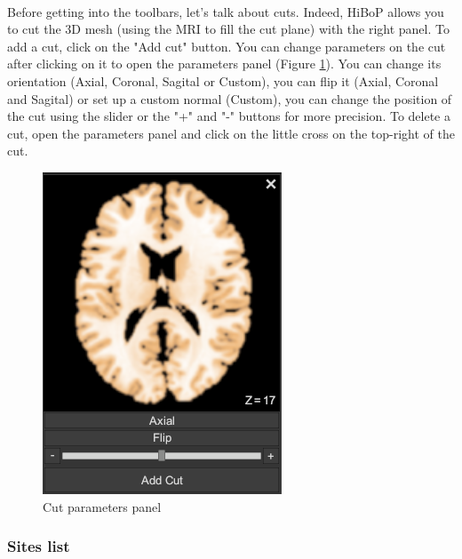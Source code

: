 \documentclass[a4paper]{article}
\begin{document}
\paragraph{} Before getting into the toolbars, let's talk about cuts. Indeed, HiBoP allows you to cut the 3D mesh (using the MRI to fill the cut plane) with the right panel. To add a cut, click on the "Add cut" button. You can change parameters on the cut after clicking on it to open the parameters panel (Figure \ref{cut}). You can change its orientation (Axial, Coronal, Sagital or Custom), you can flip it (Axial, Coronal and Sagital) or set up a custom normal (Custom), you can change the position of the cut using the slider or the "+" and "-" buttons for more precision. To delete a cut, open the parameters panel and click on the little cross on the top-right of the cut.
\begin{figure}[H]
\begin{center}
\includegraphics[scale=0.5]{Cut.png}
\end{center}
\caption{\label{cut}Cut parameters panel}
\end{figure}
\subsubsection{Sites list}\label{sitesList}
\end{document}

